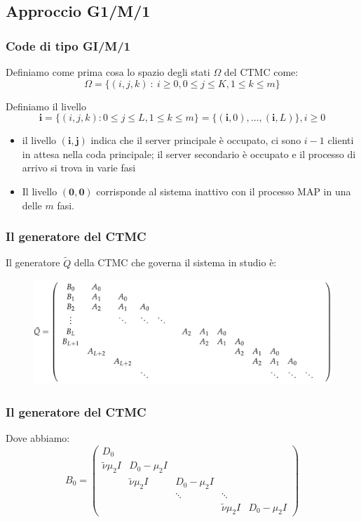 \documentclass{beamer}
\begin{document}
\subsection{Approccio G1/M/1}


\begin{frame}
    \frametitle{Code di tipo GI/M/1}
    \begin{block}{}
            Definiamo come prima cosa lo spazio degli stati $\Omega$ del CTMC come:
            $$\Omega = \{ (i,j,k) ~ : ~ i \geq 0, 0 \leq j \leq K, 1 \leq k \leq m \}$$
    \end{block}
    \begin{block}{}
        Definiamo il livello
        $$\textbf{i} = \{(i, j, k) : 0 \leq j \leq L, 1 \leq k \leq m\} = \{(\textbf{i}, 0), \dots, (\textbf{i}, L)\}, i \geq 0$$
       \begin{itemize}
        \item il livello $(\textbf{i},\textbf{j})$ indica che il server principale è occupato, ci sono $i-1$ clienti in attesa nella coda principale; il server secondario è occupato e il processo di arrivo si trova in varie fasi
        \item  Il livello $(\textbf{0},\textbf{0})$ corrisponde al sistema inattivo con il processo MAP in una delle $m$ fasi.
       \end{itemize}
    \end{block}
\end{frame}


\begin{frame}
    \frametitle{Il generatore del CTMC}
    Il generatore $\widetilde{Q}$ della CTMC che governa il sistema in studio è:
    \begin{figure}
        \centering
        \includegraphics[width=\textwidth]{Isy9B7s.png}
    \end{figure}
\end{frame}


\begin{frame}
    \frametitle{Il generatore del CTMC}
    Dove abbiamo:
    \begin{equation*}
        B_0 =
        \begin{pmatrix}
            D_0 & & & & \\
            \widetilde{\nu}\mu_2 I & D_0 - \mu_2 I & & & \\
            & \widetilde{\nu}\mu_2 I & D_0 - \mu_2 I & & \\
            & & \ddots & \ddots & \\
            & & & \widetilde{\nu}\mu_2 I & D_0 - \mu_2 I
        \end{pmatrix}
    \end{equation*}
\end{frame}
\end{document}
